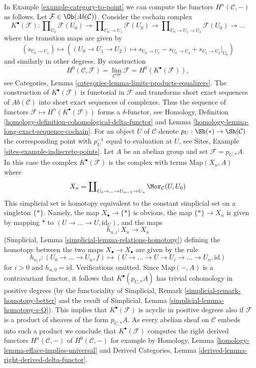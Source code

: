 \begin{example}
\label{example-right-derived-limits}
In Example \ref{example-category-to-point} we can compute
the functors $H^n(\mathcal{C}, -)$ as follows. Let
$\mathcal{F} \in \Ob(\textit{Ab}(\mathcal{C}))$.
Consider the cochain complex
$$
K^\bullet(\mathcal{F}) :
\prod\nolimits_{U_0} \mathcal{F}(U_0)
\to
\prod\nolimits_{U_0 \to U_1} \mathcal{F}(U_0)
\to
\prod\nolimits_{U_0 \to U_1 \to U_2} \mathcal{F}(U_0)
\to \ldots
$$
where the transition maps are given by
$$
(s_{U_0 \to U_1})
\longmapsto
((U_0 \to U_1 \to U_2) \mapsto s_{U_0 \to U_1} - s_{U_0 \to U_2}
+ s_{U_1 \to U_2}|_{U_0})
$$
and similarly in other degrees. By construction
$$
H^0(\mathcal{C}, \mathcal{F}) =
\lim_{\mathcal{C}^{opp}} \mathcal{F} =
H^0(K^\bullet(\mathcal{F})),
$$
see Categories, Lemma \ref{categories-lemma-limits-products-equalizers}.
The construction of $K^\bullet(\mathcal{F})$ is functorial in $\mathcal{F}$
and transforms short exact sequences of $\textit{Ab}(\mathcal{C})$ into
short exact sequences of complexes. Thus the sequence of functors
$\mathcal{F} \mapsto H^n(K^\bullet(\mathcal{F}))$ forms a $\delta$-functor, see
Homology, Definition \ref{homology-definition-cohomological-delta-functor} and
Lemma \ref{homology-lemma-long-exact-sequence-cochain}.
For an object $U$ of $\mathcal{C}$ denote $p_U : \Sh(*) \to \Sh(\mathcal{C})$
the corresponding point with $p_U^{-1}$ equal to evaluation at $U$, see
Sites, Example \ref{sites-example-indiscrete-points}.
Let $A$ be an abelian group and set $\mathcal{F} = p_{U, *}A$. In this case
the complex $K^\bullet(\mathcal{F})$ is the complex with terms
$\text{Map}(X_n, A)$ where
$$
X_n = \coprod\nolimits_{U_0 \to \ldots \to U_{n - 1} \to U_n}
\Mor_\mathcal{C}(U, U_0)
$$
This simplicial set is homotopy equivalent to the constant simplicial
set on a singleton $\{*\}$. Namely, the map $X_\bullet \to \{*\}$
is obvious, the map $\{*\} \to X_n$ is given
by mapping $*$ to $(U \to \ldots \to U, \text{id}_U)$, and the
maps
$$
h_{n, i} : X_n \longrightarrow X_n
$$
(Simplicial, Lemma \ref{simplicial-lemma-relations-homotopy})
defining the homotopy between the two maps $X_\bullet \to X_\bullet$
are given by the rule
$$
h_{n, i} :
(U_0 \to \ldots \to U_n, f)
\longmapsto
(U \to \ldots \to U \to U_i \to \ldots \to U_n, \text{id})
$$
for $i > 0$ and $h_{n, 0} = \text{id}$. Verifications omitted.
Since $\text{Map}(-, A)$ is a contravariant functor, it follows that
$K^\bullet(p_{U, *}A)$ has trivial cohomology in positive degrees
(by the functoriality of
Simplicial, Remark \ref{simplicial-remark-homotopy-better}
and the result of
Simplicial, Lemma \ref{simplicial-lemma-homotopy-s-Q}).
This implies that $K^\bullet(\mathcal{F})$ is acyclic in positive
degrees also if $\mathcal{F}$ is a product of sheaves of the form
$p_{U, *}A$. As every abelian sheaf on $\mathcal{C}$ embeds
into such a product we conclude that $K^\bullet(\mathcal{F})$
computes the right derived functors
$H^n(\mathcal{C}, -)$ of $H^0(\mathcal{C}, -)$
for example by
Homology, Lemma \ref{homology-lemma-efface-implies-universal}
and
Derived Categories, Lemma \ref{derived-lemma-right-derived-delta-functor}.
\end{example}

